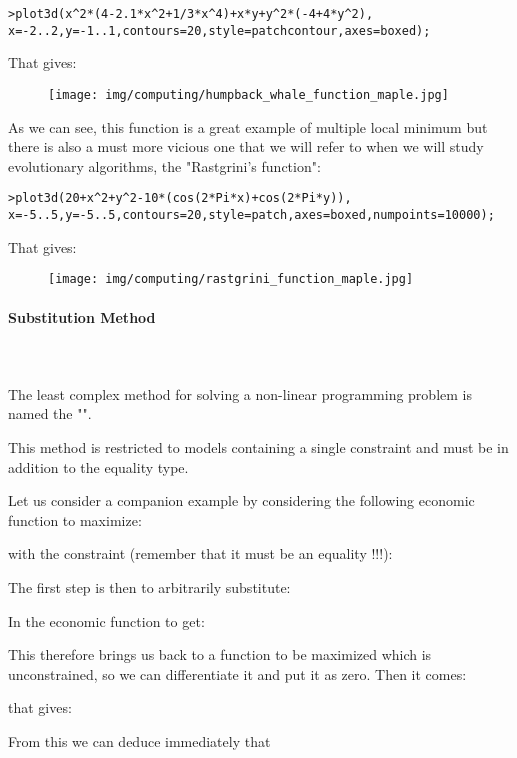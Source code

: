 	\texttt{>plot3d(x\string^2*(4-2.1*x\string^2+1/3*x\string^4)+x*y+y\string^2*(-4+4*y\string^2),\\
 x=-2..2,y=-1..1,contours=20,style=patchcontour,axes=boxed);}

	That gives:
	\begin{figure}[H]
		\centering
		\texttt{[image: img/computing/humpback\_whale\_function\_maple.jpg]}
	\end{figure}

	As we can see, this function is a great example of multiple local minimum but there is also a must more vicious one that we will refer to when we will study evolutionary algorithms, the "Rastgrini's function":
	
	\texttt{>plot3d(20+x\string^2+y\string^2-10*(cos(2*Pi*x)+cos(2*Pi*y)),\\ 	x=-5..5,y=-5..5,contours=20,style=patch,axes=boxed,numpoints=10000);}
	
	That gives:
	\begin{figure}[H]
		\centering
		\texttt{[image: img/computing/rastgrini\_function\_maple.jpg]}
	\end{figure}
	
	\paragraph{Substitution Method}\mbox{}\\\\
	The least complex method for solving a non-linear programming problem is named the "".

	This method is restricted to models containing a single constraint and must be in addition to the equality type.

	Let us consider a companion example by considering the following economic function to maximize:
	
 	with the constraint (remember that it must be an equality !!!):
	
 	The first step is then to arbitrarily substitute:
	
 	In the economic function to get:
	
 	This therefore brings us back to a function to be maximized which is unconstrained, so we can differentiate it and put it as zero. Then it comes:
	
	that gives:
	
	From this we can deduce immediately that
	
